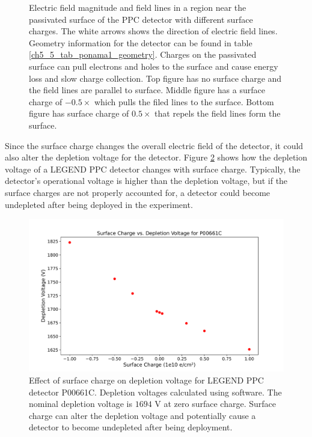 \begin{figure}
\caption{Electric field magnitude and field lines in a region near the passivated surface of the {\ponama} PPC detector with different surface charges. The white arrows shows the direction of electric field lines. Geometry information for the detector can be found in table \ref{ch5_5_tab_ponama1_geometry}. Charges on the passivated surface can pull electrons and holes to the surface and cause energy loss and slow charge collection. Top figure has no surface charge and the field lines are parallel to surface. Middle figure has a surface charge of $-0.5 \times$ {\scunit} which pulls the filed lines to the surface. Bottom figure has surface charge of $0.5 \times$ {\scunit} that repels the field lines form the surface.}
\label{ch3_fig_surface_field_sc0}
\end{figure}

Since the surface charge changes the overall electric field of the detector, it could also alter the depletion voltage for the detector. Figure \ref{ch3_fig_deplection_sc} shows how the depletion voltage of a LEGEND PPC detector changes with surface charge. Typically, the detector's operational voltage is higher than the depletion voltage, but if the surface charges are not properly accounted for, a detector could become undepleted after being deployed in the experiment.

\begin{figure}[!htb]
\centering
\includegraphics[trim={1cm 0.4cm 1cm 1.75cm},clip,width=0.99\linewidth]{ch3/figs/deplep_sc.pdf}
 \caption{Effect of surface charge on depletion voltage for LEGEND PPC detector P00661C. Depletion voltages calculated using {\siggen} software. The nominal depletion voltage is $1694$ V at zero surface charge. Surface charge can alter the depletion voltage and potentially cause a detector to become undepleted after being deployment.
}
\label{ch3_fig_deplection_sc}
  \end{figure}

